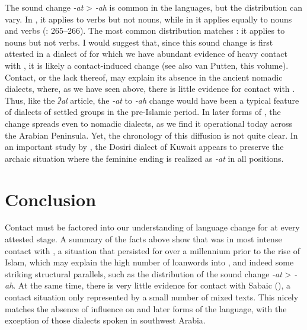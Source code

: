 \documentclass[output=paper]{langsci/langscibook}
\begin{document}
The sound change \textit{-at} > \textit{-ah} is common in the  languages, but the distribution can vary. In , it applies to verbs but not nouns, while in  it applies equally to nouns and verbs (\citealt{HuehnergardRubin2011}: 265--266). The most common  distribution matches : it applies to nouns but not verbs. I would suggest that, since this sound change is first attested in a dialect of  for which we have abundant evidence of heavy contact with , it is likely a contact-induced change (see also van Putten, this volume). Contact, or the lack thereof, may explain its absence in the ancient nomadic dialects, where, as we have seen above, there is little evidence for contact with . Thus, like the \textit{ʔal} {article}, the \textit{-at} to \textit{-ah} change would have been a typical feature of  dialects of settled groups in the pre-Islamic period. In later forms of , the change spreads even to nomadic dialects, as we find it operational today across the Arabian Peninsula. Yet, the chronology of this {diffusion} is not quite clear. In an important study by \citet{vanPutten2017}, the Dosiri dialect of Kuwait appears to preserve the archaic situation where the feminine ending is realized as \textit{-at} in all positions.

\section{Conclusion}\largerpage
Contact must be factored into our understanding of {language change} for  at every attested stage. A summary of the facts above show that  was in most intense contact with , a situation that persisted for over a millennium prior to the rise of Islam, which may explain the high number of  {loanwords} into , and indeed some striking structural parallels, such as the distribution of the sound change \textit{-at} > \textit{-ah}. At the same time, there is very little evidence for contact with Sabaic (), a contact situation only represented by a small number of mixed texts.  This nicely matches the absence of  influence on   and later forms of the language, with the exception of those dialects spoken in southwest Arabia.
\end{document}
